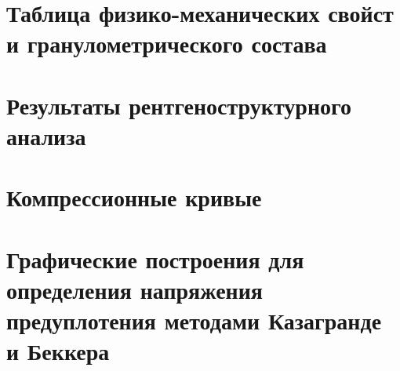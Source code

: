 \chapter{Таблица физико-механических свойст и гранулометрического состава}\label{app:tp}

\newpage

\newpage

\chapter{Результаты рентгеноструктурного анализа}\label{app:ct}


\chapter{Компрессионные кривые}\label{app:ct}


\chapter{Графические построения для определения напряжения предуплотения методами Казагранде и Беккера}\label{app:methods}
